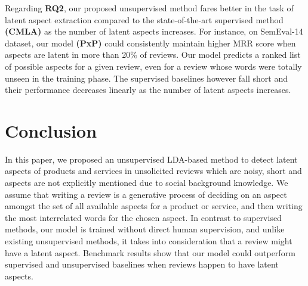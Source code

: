 \documentclass[11pt]{article}
\begin{document}
Regarding \textbf{RQ2}, our proposed unsupervised method fares better in the task of latent aspect extraction compared to the state-of-the-art supervised method \textbf{(CMLA)} as the number of latent aspects increases. For instance, on SemEval-14 dataset, our model \textbf{(PxP)} could consistently maintain higher MRR score when aspects are latent in more than 20\% of reviews. Our model predicts a ranked list of possible aspects for a given review, even for a review whose words were totally unseen in the training phase. The supervised baselines however fall short and their performance decreases linearly as the number of latent aspects increases. 

\section{Conclusion}
In this paper, we proposed an unsupervised LDA-based method to detect latent aspects of products and services in unsolicited reviews which are noisy, short and aspects are not explicitly mentioned due to social background knowledge. We assume that writing a review is a generative process of deciding on an aspect amongst the set of all available aspects for a product or service, and then writing the most interrelated words for the chosen aspect. In contrast to supervised methods, our model is trained without direct human supervision, and unlike existing unsupervised methods, it takes into consideration that a review might have a latent aspect. Benchmark results show that our model could outperform supervised and unsupervised baselines when reviews happen to have latent aspects.


\end{document}
